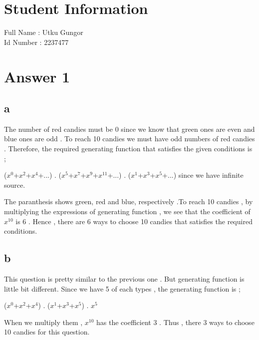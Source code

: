 \documentclass[12pt]{article}
\begin{document}
\section*{Student Information } 
Full Name : Utku Gungor \\
Id Number : 2237477 \\

\section*{Answer 1}
\subsection*{a} 
\hspace{15px} The number of red candies must be 0 since we know that green ones are even and blue ones are odd . To reach 10 candies we must have odd numbers of red candies . Therefore, the required generating function that satisfies the given conditions is ; \par  (\textit{$x^0$}+\textit{$x^2$}+\textit{$x^4$}+...) . (\textit{$x^5$}+\textit{$x^7$}+\textit{$x^9$}+\textit{$x^{11}$}+...) . (\textit{$x^1$}+\textit{$x^3$}+\textit{$x^5$}+...) since we have infinite source. \par The paranthesis shows green, red and blue, respectively .To reach 10 candies , by multiplying the expressions of generating function , we see that the coefficient of \textit{$x^{10}$} is 6 . Hence , there are 6 ways to choose 10 candies that satisfies the required conditions.

\subsection*{b}
\hspace{15px} This question is pretty similar to the previous one . But generating function is little bit different. Since we have 5 of each types , the generating function is ; \par 
(\textit{$x^0$}+\textit{$x^2$}+\textit{$x^4$}) . (\textit{$x^1$}+\textit{$x^3$}+\textit{$x^5$}) . \textit{$x^5$} \par 
When we multiply them , \textit{$x^{10}$} has the coefficient 3 . Thus , there 3 ways to choose 10 candies for this question.
\end{document}
